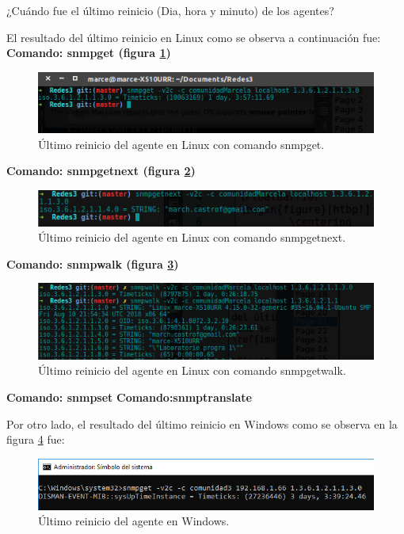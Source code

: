 \item ¿Cuándo fue el último reinicio (Dia, hora y minuto)  de los agentes?

El resultado del último reinicio en Linux como se observa a continuación fue:
\\ 
\textbf{Comando: snmpget (figura \ref{image:reinicio})}
\FloatBarrier
\begin{figure}[htbp!]
		\centering
	\includegraphics[width=.9 \textwidth]{images/Pregunta1}
		\caption{Último reinicio del agente en Linux con comando snmpget.}
		\label{image:reinicio}
\end{figure}
\FloatBarrier

\textbf{Comando: snmpgetnext (figura \ref{image:reinicionext})}
\FloatBarrier
\begin{figure}[htbp!]
		\centering
	\includegraphics[width=.9 \textwidth]{images/reinicionext}
		\caption{Último reinicio del agente en Linux con comando snmpgetnext.}
	\label{image:reinicionext}
\end{figure}
\FloatBarrier
\textbf{Comando: snmpwalk (figura \ref{image:reiniciowalk})}
\FloatBarrier
\begin{figure}[htbp!]
		\centering
	\includegraphics[width=.9 \textwidth]{images/reiniciowalk}
		\caption{Último reinicio del agente en Linux con comando snmpgetwalk.}
	\label{image:reiniciowalk}
\end{figure}
\FloatBarrier
\textbf{Comando: snmpset}
\textbf{Comando:snmptranslate}

Por otro lado, el resultado del último reinicio en Windows como se observa en la figura \ref{image:reinicioW} fue:

\FloatBarrier
\begin{figure}[htbp!]
		\centering
			\includegraphics[width=.9 \textwidth]{images/windows1}
		\caption{Último reinicio del agente en Windows.}
		\label{image:reinicioW}
\end{figure}
\FloatBarrier

